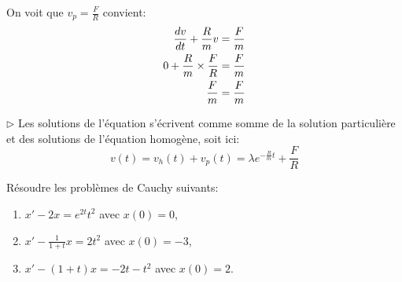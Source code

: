 {\begin{td-sol}[]
\begin{itemize}
				On voit que \(v_p=\frac FR\) convient:
				\begin{equation*}
					\begin{aligned}
						\frac{\mathop{}\!{d} v}{\mathop{}\!{d} t}+\frac Rmv&=\frac Fm\\
						0+\frac Rm\times \frac FR &= \frac Fm\\
						\frac Fm &= \frac Fm
					\end{aligned}
				\end{equation*}
			\end{itemize}

			\(\triangleright\) Les solutions de l'équation s'écrivent comme somme de la 
			solution particulière et des solutions de l'équation homogène, soit ici:
			\begin{equation*}
				v(t)= v_h(t) + v_p(t) = \lambda e^{-{\frac Rm t}} + \frac FR
			\end{equation*}
		\end{td-sol}
}{}

\begin{td-exo}[] %
	Résoudre les problèmes de Cauchy suivants:
	\begin{enumerate}
		\item \(x'-2x=e^{2t}t^2\) avec \(x(0)=0\),
		\item \(x' -\frac1{1+t}x=2t^2\) avec \(x(0)=-3\),
		\item \(x'-(1+t)x=-2t-t^2\) avec \(x(0)=2\).
	\end{enumerate}

\end{td-exo}

